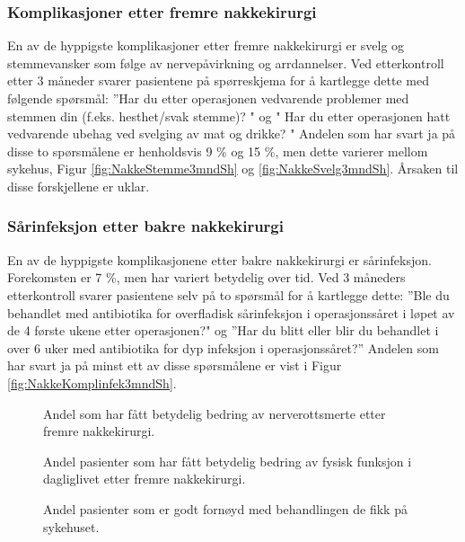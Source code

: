 \subsubsection{Komplikasjoner etter fremre nakkekirurgi}
En av de hyppigste komplikasjoner etter fremre nakkekirurgi er svelg og stemmevansker som følge av nervepåvirkning og arrdannelser. Ved etterkontroll etter 3 måneder svarer pasientene på spørreskjema for å kartlegge dette med følgende spørsmål: ''Har du etter operasjonen vedvarende problemer med stemmen din (f.eks. hesthet/svak stemme)? " og " Har du etter operasjonen hatt vedvarende ubehag ved svelging av mat og drikke? "
Andelen som har svart ja på disse to spørsmålene er henholdsvis 9 \% og 15 \%, men dette  varierer mellom sykehus, Figur \ref{fig:NakkeStemme3mndSh} og \ref{fig:NakkeSvelg3mndSh}. Årsaken til disse forskjellene er uklar. 
\subsubsection{Sårinfeksjon etter bakre nakkekirurgi}
En av de hyppigste komplikasjonene etter bakre nakkekirurgi er  sårinfeksjon. Forekomsten er 7 \%, men har variert betydelig over tid. Ved  3 måneders etterkontroll svarer pasientene selv på to spørsmål  for å kartlegge dette: ''Ble du behandlet med antibiotika for overfladisk sårinfeksjon i operasjonssåret i løpet av de 4 første ukene etter operasjonen?" og ''Har du blitt eller blir du behandlet i over 6 uker med antibiotika for dyp infeksjon i operasjonssåret?''   Andelen som har svart ja på minst ett av disse spørsmålene er vist i Figur \ref{fig:NakkeKomplinfek3mndSh}.  



\begin{figure}[ht]
\caption{\label{fig:NakkeNRSsmerteArmEndr12mndUmFSh} Andel som har fått betydelig bedring av nerverottsmerte  etter fremre nakkekirurgi.}
\end{figure}

\begin{figure}[ht]
\caption{\label{fig:NakkeNDIendr12mndUmFSh} Andel pasienter som har fått betydelig bedring av fysisk funksjon i dagliglivet etter fremre nakkekirurgi.}
\end{figure}

\begin{figure}[ht]
\caption{\label{fig:NakkeFornoydBeh12mndFremSh} Andel pasienter som er godt fornøyd med behandlingen de fikk på sykehuset.}
\end{figure}

